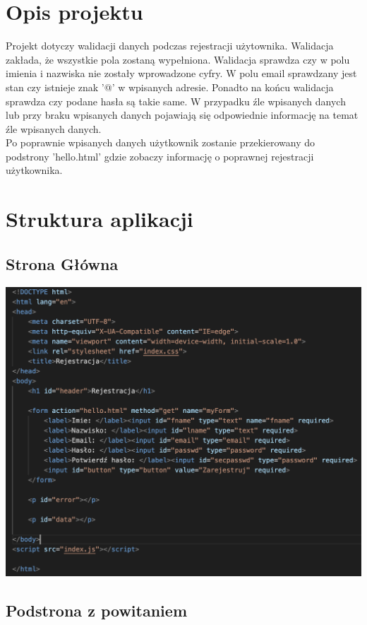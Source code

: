 \documentclass[12pt, letterpaper]{article}
\begin{document}
\section{Opis projektu}

\quad Projekt dotyczy walidacji danych podczas rejestracji użytownika. Walidacja zakłada, że wszystkie pola zostaną wypełniona. Walidacja sprawdza czy w polu imienia i nazwiska nie zostały wprowadzone cyfry. W polu email sprawdzany jest stan czy istnieje znak '@' w wpisanych adresie. Ponadto na końcu walidacja sprawdza czy podane hasła są takie same. W przypadku źle wpisanych danych lub przy braku wpisanych danych pojawiają się odpowiednie informację na temat źle wpisanych danych.\\ Po poprawnie wpisanych danych użytkownik zostanie przekierowany do podstrony 'hello.html' gdzie zobaczy informację o poprawnej rejestracji użytkownika.

\section{Struktura aplikacji}

\subsection{Strona Główna}

\begin{center}
	\includegraphics[scale=0.5]{index}
\end{center}

\subsection{Podstrona z powitaniem}
\end{document}
